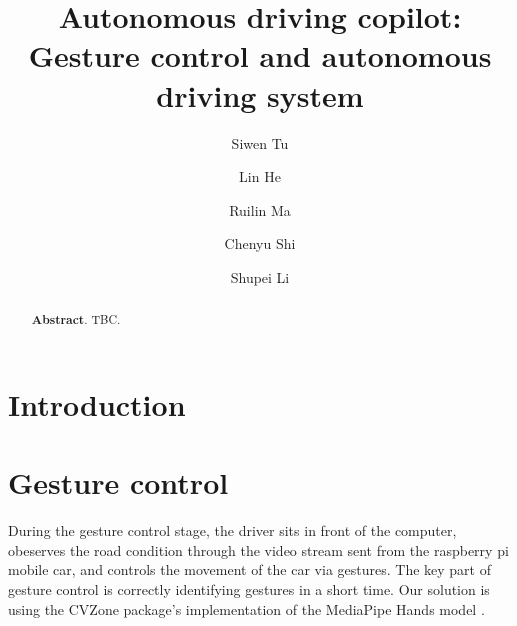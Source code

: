 \documentclass[acmsmall]{acmart}
\begin{document}
\title{Autonomous driving copilot: Gesture control and autonomous driving system}

\author{Siwen Tu}
\author{Lin He}
\author{Ruilin Ma}
\author{Chenyu Shi}
\author{Shupei Li}


\renewcommand{\shortauthors}{S. Tu, L. He, R. Ma, C. Shi and S. Li}

\begin{abstract}
    \textbf{Abstract}. TBC.
\end{abstract}



\maketitle

\section{Introduction}

\section{Gesture control}
During the gesture control stage, the driver sits in front of the computer, obeserves the road condition through the video stream sent from the raspberry pi mobile car, and controls the movement of the car via gestures. The key part of gesture control is correctly identifying gestures in a short time. Our solution is using the CVZone package's implementation of the MediaPipe Hands model \cite{cvzone}.
\end{document}
